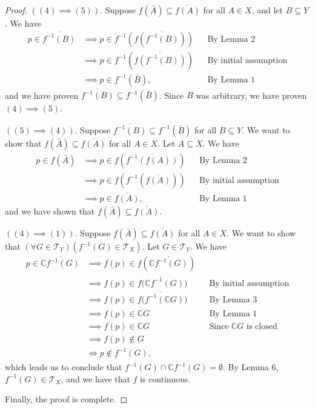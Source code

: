 \documentclass[10pt,a4paper]{article}
\theoremstyle{theorem}
\theoremstyle{definition}
\newcommand{\Tau}{\mathcal{T}}
\begin{document}
\begin{proof}
$((4) \implies (5))$.  Suppose $f(\bar{A}) \subseteq \overline{f(A)}$ for all $A \in X$, and let $B \subseteq Y$. We have
\begin{align*}
p \in \overline{f^{-1}(B)} &\implies p \in f^{-1}(f(\overline{f^{-1}(B)})) && \text{By Lemma 2}\\
&\implies p \in f^{-1}(\overline{f(f^{-1}(B))}) && \text{By initial assumption}\\
&\implies p \in f^{-1}(\bar{B}), &&\text{By Lemma 1}
\end{align*}
and we have proven $\overline{f^{-1}(B)} \subseteq f^{-1}(\bar{B})$. Since $B$ was arbitrary, we have proven $(4) \implies (5)$.

$((5) \implies (4))$.  Suppose $\overline{f^{-1}(B)} \subseteq f^{-1}(\bar{B})$ for all $B \subseteq Y$. We want to show that $f(\bar{A}) \subseteq \overline{f(A)}$ for all $A \in X$.  Let $A \subseteq X$. We have
\begin{align*}
p \in f(\bar{A}) &\implies p \in f(\overline{f^{-1}(f(A))}) &&\text{By Lemma 2}\\
&\implies p \in f(f^{-1}(\overline{f(A)})) && \text{By initial assumption}\\
&\implies p \in \overline{f(A)}, &&\text{By Lemma 1}
\end{align*}
and we have shown that $f(\bar{A}) \subseteq \overline{f(A)}$.

$((4) \implies (1))$.  Suppose $f(\bar{A}) \subseteq \overline{f(A)}$ for all $A \in X$. We want to show that $(\forall G \in \Tau_Y)(f^{-1}(G) \in \Tau_X)$. Let $G \in \Tau_Y$.  We have
\begin{align*}
p \in \overline{\mathbb{C}f^{-1}(G)} &\implies  f(p) \in f(\overline{\mathbb{C}f^{-1}(G)})\\
&\implies f(p) \in \overline{f(\mathbb{C}f^{-1}(G)}) &&\text{By initial assumption}\\
&\implies f(p) \in \overline{f(f^{-1}(\mathbb{C}G)})&&\text{By Lemma 3}\\
&\implies f(p) \in \overline{\mathbb{C}G}&&\text{By Lemma 1}\\
&\implies f(p) \in \mathbb{C}G&&\text{Since } \mathbb{C}G \text{ is closed}\\
&\implies f(p) \not \in G\\
&\iff p \not \in f^{-1}(G),
\end{align*}
which leads us to conclude that $f^{-1}(G) \cap \overline{\mathbb{C}f^{-1}(G)} = \emptyset$. By Lemma 6, $f^{-1}(G) \in \Tau_X$, and we have that $f$ is continuous.

Finally, the proof is complete.
\end{proof}
\end{document}
